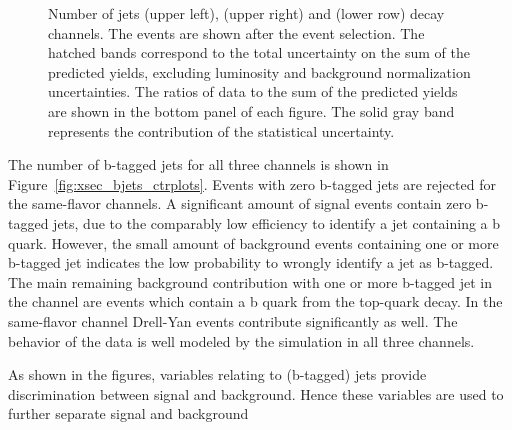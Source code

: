 \begin{figure}[htbp!]
\begin{center}
    \caption{Number of jets \emu (upper left), \mumu (upper right) and \ee (lower row) decay channels.
        The events are shown after the
        event selection.  The hatched
        bands correspond to the total uncertainty on the sum of the
        predicted yields, excluding luminosity and background
        normalization uncertainties. 
        The ratios of data to the sum of the predicted yields are
        shown in the bottom panel of each figure. The solid gray band
        represents the contribution of the statistical uncertainty.}  
       \label{fig:xsec_jets_ctrplots}
  \end{center}
\end{figure}

The number of b-tagged jets for all three channels is shown in Figure~\ref{fig:xsec_bjets_ctrplots}.
Events with zero b-tagged jets are rejected for the same-flavor channels.
A significant amount of \ttbar signal events contain zero b-tagged jets, due to the comparably low efficiency to identify a jet containing a b quark.
However, the small amount of background events containing one or more b-tagged jet indicates the low probability to wrongly identify a jet as b-tagged.
The main remaining background contribution with one or more b-tagged jet in the \emu channel are events which contain a b quark from the top-quark decay.
In the same-flavor channel Drell-Yan events contribute significantly as well.
The behavior of the data is well modeled by the simulation in all three channels.

As shown in the figures, variables relating to (b-tagged) jets provide discrimination between signal and background. Hence these variables
are used to further separate signal and background

